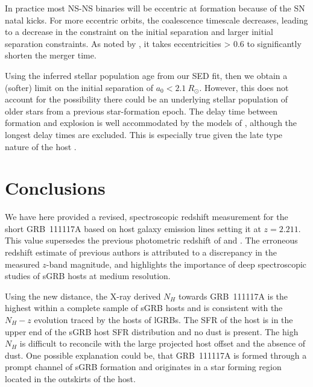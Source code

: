 \documentclass{aa}    %
\begin{document}
In practice most NS-NS binaries will be eccentric at formation because of the SN
natal kicks. For more eccentric orbits, the coalescence timescale decreases,
leading to a decrease in the constraint on the initial separation and larger
initial separation constraints. As noted by \citet{Postnov2014}, it takes
eccentricities > 0.6 to significantly shorten the merger time.

Using the inferred stellar population age from our SED fit, then we obtain a
(softer) limit on the initial separation of $a_0 < 2.1~R_\odot$. However, this
does not account for the possibility there could be an underlying stellar
population of older stars from a previous star-formation epoch. The delay time
between formation and explosion is well accommodated by the models of
\citet{Belczynski2006}, although the longest delay times are excluded.
This is especially true given the late type nature of the host
\citep{OShaughnessy2008}.

\section{Conclusions}

We have here provided a revised, spectroscopic redshift measurement for the
short GRB~111117A based on host galaxy emission lines setting it at $z = 2.211$.
This value supersedes the previous photometric redshift of \citet{Margutti2012}
and \citet{Sakamoto2013}. The erroneous redshift estimate of previous authors is
attributed to a discrepancy in the measured $z$-band magnitude, and highlights
the importance of deep spectroscopic studies of sGRB hosts at medium resolution.

Using the new distance, the X-ray derived $N_H$ towards GRB~111117A is the
highest within a complete sample of sGRB hosts and is consistent with the
$N_H-z$ evolution traced by the hosts of lGRBs. The SFR of the host is in the
upper end of the sGRB host SFR distribution and no dust is present. The high
$N_H$ is difficult to reconcile with the large projected host offset and the
absence of dust. One possible explanation could be, that GRB~111117A is formed
through a prompt channel of sGRB formation and originates in a star forming
region located in the outskirts of the host.
\end{document}
